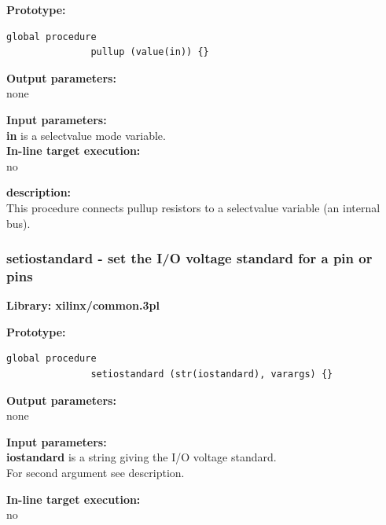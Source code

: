             {\bf Prototype:} \\
            \vsp
            \begin{lstlisting}[gobble=12, language=threepl]
               global procedure
               pullup (value(in)) {}
            \end{lstlisting}

            {\bf Output parameters:} \\
            none

            {\bf Input parameters:} \\            
            {\bf in} is a selectvalue mode variable. \\
        
            {\bf In-line target execution:} \\
            no

            {\bf description:} \\
            This procedure connects pullup resistors to a selectvalue
            variable (an internal bus).


            

        \subsubsection{setiostandard - set the I/O voltage standard for a pin or pins}\label{sec:lpsetiostandard}
            
            {\bf Library: xilinx/common.3pl}

            {\bf Prototype:} \\
            \vsp
            \begin{lstlisting}[gobble=12, language=threepl]
               global procedure
               setiostandard (str(iostandard), varargs) {}
            \end{lstlisting}

            {\bf Output parameters:} \\
            none

            {\bf Input parameters:} \\            
            {\bf iostandard} is a string giving the I/O voltage standard.\\
            For second argument see description.
        
            {\bf In-line target execution:} \\
            no

